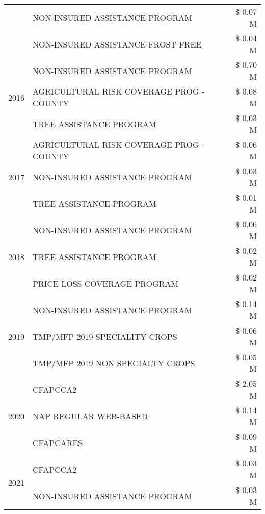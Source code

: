 \begin{tabular}{llr}
 & NON-INSURED ASSISTANCE PROGRAM & \$ 0.07 M \\
 & NON-INSURED ASSISTANCE FROST FREE & \$ 0.04 M \\
\cline{1-3}
\multirow[t]{3}{*}{2016} & NON-INSURED ASSISTANCE PROGRAM & \$ 0.70 M \\
 & AGRICULTURAL RISK COVERAGE PROG - COUNTY & \$ 0.08 M \\
 & TREE ASSISTANCE PROGRAM & \$ 0.03 M \\
\cline{1-3}
\multirow[t]{3}{*}{2017} & AGRICULTURAL RISK COVERAGE PROG - COUNTY & \$ 0.06 M \\
 & NON-INSURED ASSISTANCE PROGRAM & \$ 0.03 M \\
 & TREE ASSISTANCE PROGRAM & \$ 0.01 M \\
\cline{1-3}
\multirow[t]{3}{*}{2018} & NON-INSURED ASSISTANCE PROGRAM & \$ 0.06 M \\
 & TREE ASSISTANCE PROGRAM & \$ 0.02 M \\
 & PRICE LOSS COVERAGE PROGRAM & \$ 0.02 M \\
\cline{1-3}
\multirow[t]{3}{*}{2019} & NON-INSURED ASSISTANCE PROGRAM & \$ 0.14 M \\
 & TMP/MFP 2019 SPECIALITY CROPS & \$ 0.06 M \\
 & TMP/MFP 2019 NON SPECIALTY CROPS & \$ 0.05 M \\
\cline{1-3}
\multirow[t]{3}{*}{2020} & CFAPCCA2 & \$ 2.05 M \\
 & NAP REGULAR WEB-BASED & \$ 0.14 M \\
 & CFAPCARES & \$ 0.09 M \\
\cline{1-3}
\multirow[t]{2}{*}{2021} & CFAPCCA2 & \$ 0.03 M \\
 & NON-INSURED ASSISTANCE PROGRAM & \$ 0.03 M \\
\cline{1-3}
\bottomrule
\end{tabular}
